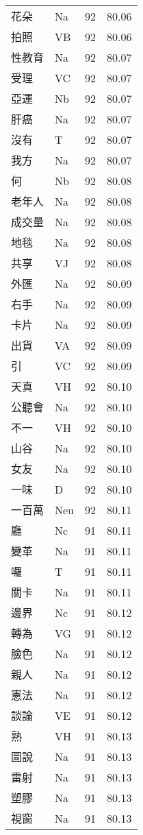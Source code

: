 \documentclass[twocolumn]{book}
\begin{document}
\begin{supertabular}{llrr}
花朵 & Na & 92 &  80.06\\
拍照 & VB & 92 &  80.06\\
性教育 & Na & 92 &  80.07\\
受理 & VC & 92 &  80.07\\
亞運 & Nb & 92 &  80.07\\
肝癌 & Na & 92 &  80.07\\
沒有 & T & 92 &  80.07\\
我方 & Na & 92 &  80.07\\
何 & Nb & 92 &  80.08\\
老年人 & Na & 92 &  80.08\\
成交量 & Na & 92 &  80.08\\
地毯 & Na & 92 &  80.08\\
共享 & VJ & 92 &  80.08\\
外匯 & Na & 92 &  80.09\\
右手 & Na & 92 &  80.09\\
卡片 & Na & 92 &  80.09\\
出貨 & VA & 92 &  80.09\\
引 & VC & 92 &  80.09\\
天真 & VH & 92 &  80.10\\
公聽會 & Na & 92 &  80.10\\
不一 & VH & 92 &  80.10\\
山谷 & Na & 92 &  80.10\\
女友 & Na & 92 &  80.10\\
一味 & D & 92 &  80.10\\
一百萬 & Neu & 92 &  80.11\\
廳 & Nc & 91 &  80.11\\
變革 & Na & 91 &  80.11\\
囉 & T & 91 &  80.11\\
關卡 & Na & 91 &  80.11\\
邊界 & Nc & 91 &  80.12\\
轉為 & VG & 91 &  80.12\\
臉色 & Na & 91 &  80.12\\
親人 & Na & 91 &  80.12\\
憲法 & Na & 91 &  80.12\\
談論 & VE & 91 &  80.12\\
熟 & VH & 91 &  80.13\\
圖說 & Na & 91 &  80.13\\
雷射 & Na & 91 &  80.13\\
塑膠 & Na & 91 &  80.13\\
視窗 & Na & 91 &  80.13\\

\end{supertabular}
\end{document}
